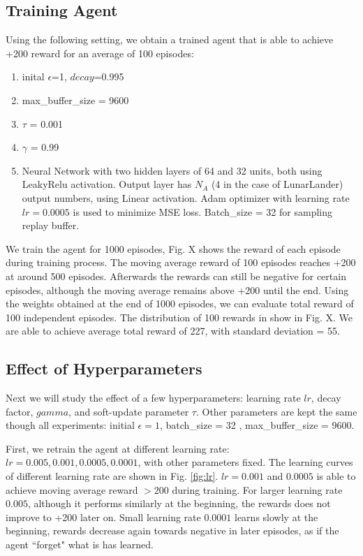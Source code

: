 \documentclass[conference]{IEEEtran}
\begin{document}
\subsection{Training Agent}
Using the following setting, we obtain a trained agent that is able to achieve +200 reward for an average of 100 episodes:
\begin{enumerate}
\item inital $\epsilon$=1, $decay$=0.995
\item max\_buffer\_size = 9600
\item $\tau$ = 0.001
\item $\gamma$ = 0.99
\item Neural Network with two hidden layers of 64 and 32 units, both using LeakyRelu activation. Output layer has $N_A$ (4 in the case of LunarLander) output numbers, using Linear activation. Adam optimizer with learning rate $lr=0.0005$ is used to minimize MSE loss. Batch\_size = 32 for sampling replay buffer.
\end{enumerate}
We train the agent for 1000 episodes, Fig. X shows the reward of each episode during training process. The moving average reward of 100 episodes reaches +200 at around 500 episodes. Afterwards the rewards can still be negative for certain episodes, although the moving average remains above +200 until the end. Using the weights obtained at the end of 1000 episodes, we can evaluate total reward of 100 independent episodes. The distribution of 100 rewards in show in Fig. X. We are able to achieve average total reward of 227, with standard deviation = 55.

\subsection{Effect of Hyperparameters}
Next we will study the effect of a few hyperparameters: learning rate $lr$, decay factor, $gamma$, and soft-update parameter $\tau$. Other parameters are kept the same though all experiments: initial $\epsilon=1$, batch\_size = 32 , max\_buffer\_size = 9600.

First, we retrain the agent at different learning rate: $lr = 0.005, 0.001, 0.0005, 0.0001$, with other parameters fixed. The learning curves of different learning rate are shown in Fig. \ref{fig:lr}. $lr = 0.001$ and $0.0005$ is able to achieve moving average reward $>200$ during training. For larger learning rate $0.005$, although it performs similarly at the beginning, the rewards does not improve to +200 later on. Small learning rate $0.0001$ learns slowly at the beginning, rewards decrease again towards negative in later episodes, as if the agent ``forget" what is has learned. 
\end{document}
